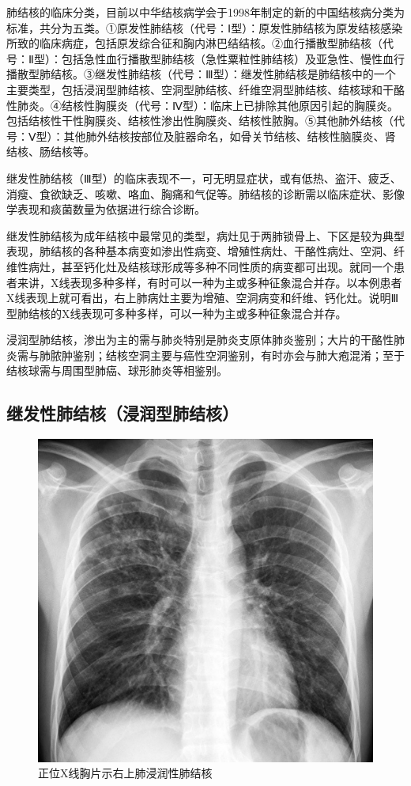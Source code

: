 肺结核的临床分类，目前以中华结核病学会于1998年制定的新的中国结核病分类为标准，共分为五类。①原发性肺结核（代号：Ⅰ型）：原发性肺结核为原发结核感染所致的临床病症，包括原发综合征和胸内淋巴结结核。②血行播散型肺结核（代号：Ⅱ型）：包括急性血行播散型肺结核（急性粟粒性肺结核）及亚急性、慢性血行播散型肺结核。③继发性肺结核（代号：Ⅲ型）：继发性肺结核是肺结核中的一个主要类型，包括浸润型肺结核、空洞型肺结核、纤维空洞型肺结核、结核球和干酪性肺炎。④结核性胸膜炎（代号：Ⅳ型）：临床上已排除其他原因引起的胸膜炎。包括结核性干性胸膜炎、结核性渗出性胸膜炎、结核性脓胸。⑤其他肺外结核（代号：Ⅴ型）：其他肺外结核按部位及脏器命名，如骨关节结核、结核性脑膜炎、肾结核、肠结核等。

继发性肺结核（Ⅲ型）的临床表现不一，可无明显症状，或有低热、盗汗、疲乏、消瘦、食欲缺乏、咳嗽、咯血、胸痛和气促等。肺结核的诊断需以临床症状、影像学表现和痰菌数量为依据进行综合诊断。

继发性肺结核为成年结核中最常见的类型，病灶见于两肺锁骨上、下区是较为典型表现，肺结核的各种基本病变如渗出性病变、增殖性病灶、干酪性病灶、空洞、纤维性病灶，甚至钙化灶及结核球形成等多种不同性质的病变都可出现。就同一个患者来讲，X线表现多种多样，有时可以一种为主或多种征象混合并存。以本例患者X线表现上就可看出，右上肺病灶主要为增殖、空洞病变和纤维、钙化灶。说明Ⅲ型肺结核的X线表现可多种多样，可以一种为主或多种征象混合并存。

浸润型肺结核，渗出为主的需与肺炎特别是肺炎支原体肺炎鉴别；大片的干酪性肺炎需与肺脓肿鉴别；结核空洞主要与癌性空洞鉴别，有时亦会与肺大疱混淆；至于结核球需与周围型肺癌、球形肺炎等相鉴别。

\subsection{继发性肺结核（浸润型肺结核）}

\begin{figure}[!htbp]
 \centering
 \includegraphics{./images/Image00155.jpg}
 \captionsetup{justification=centering}
 \caption{正位X线胸片示右上肺浸润性肺结核}
 \label{fig3-5-3}
  \end{figure} 

